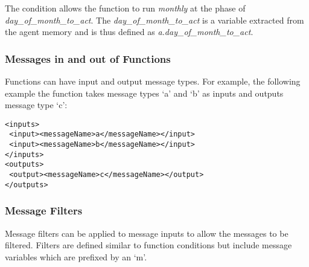  The condition allows the function to run \emph{monthly} at the phase
 of \emph{day\_of\_month\_to\_act}. The
 \emph{day\_of\_month\_to\_act} is a variable extracted from the
 agent memory and is thus defined as
 \emph{a.day\_of\_month\_to\_act}.

%
%
\subsubsection{Messages in and out of Functions}
Functions can have input and output message types. For example, the following
example the function takes message types `a' and `b' as inputs and outputs
message type `c':

\begin{mylisting}
\begin{verbatim}
<inputs>
 <input><messageName>a</messageName></input>
 <input><messageName>b</messageName></input>
</inputs>
<outputs>
 <output><messageName>c</messageName></output>
</outputs>
\end{verbatim}
\end{mylisting}

\subsubsection{Message Filters}\label{sect:msgfilter}
Message filters can be applied to message inputs to allow the messages to be
filtered. Filters are defined similar to function conditions but include
message variables which are prefixed by an `m'.

